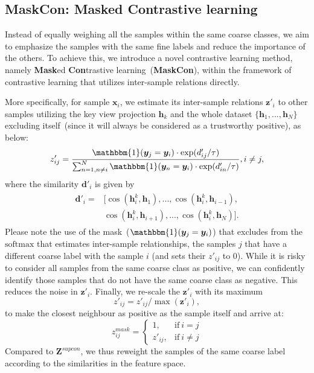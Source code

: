 \documentclass[10pt,twocolumn,letterpaper]{article}
\def\vd{{\bm{d}}}
\def\vh{{\bm{h}}}
\def\vx{{\bm{x}}}
\def\vy{{\bm{y}}}
\def\vz{{\bm{z}}}
\def\mZ{{\bm{Z}}}
\newcommand{\softmax}{\mathrm{softmax}}
\begin{document}
\subsection{MaskCon: Masked Contrastive learning}\label{method_maskcon}
Instead of equally weighing all the samples within the same coarse classes, we aim to emphasize the samples with the same fine labels and reduce the importance of the others. To achieve this, we introduce a novel contrastive learning method, namely \textbf{Mask}ed \textbf{Con}trastive learning~(\textbf{MaskCon}), within the framework of contrastive learning that utilizes inter-sample relations directly.


More specifically, for sample $\vx_i$, we estimate its inter-sample relations $\vz'_i$ to other samples utilizing the key view projection $\vh_k$ and the whole dataset $\{\vh_1, ..., \vh_N\}$ excluding itself~(since it will always be considered as a trustworthy positive), as below:
\begin{equation}\label{eq:mask_inter}
    z'_{ij} =  \frac{\mathbbm{1}(\vy_j = \vy_i)\cdot \exp(d'_{ij}/\tau)}{\sum_{n=1, n\neq i}^N\mathbbm{1}(\vy_n = \vy_i)\cdot \exp(d'_{in}/\tau)}, i\neq j,
\end{equation}
where the similarity $\vd'_i$ is given by
\begin{align}\label{eq:pseudosim}
\begin{split}
\vd'_i = &[\cos(\vh^k_i, \vh_1),...,\cos(\vh^k_i, \vh_{i-1}),\\&\cos(\vh^k_i, \vh_{i+1}),..., \cos(\vh^k_i, \vh_N)].
\end{split}
\end{align}
Please note the use of the mask~($\mathbbm{1}(\vy_j = \vy_i)$) that excludes from the $\softmax$ that estimates inter-sample relationships, the samples $j$ that have a different coarse label with the sample $i$ (and sets their $z'_{ij}$ to 0). While it is risky to consider all samples from the same coarse class as positive, we can confidently identify those samples that do not have the same coarse class as negative. This reduces the noise in $\vz'_i$.
Finally, we re-scale the $\vz'_i$ with its maximum
\begin{equation}
    z'_{ij} = z'_{ij} / \max(\vz'_i),
\end{equation}
to make the closest neighbour as positive as the sample itself and arrive at:
\begin{equation}
    z^{mask}_{ij}=\left\{
                \begin{array}{ll}
                  1, &\text{if}\ i=j\\
                  z'_{ij}, &\text{if}\ i\neq j
                \end{array}
              \right.
\end{equation}
Compared to $\mZ^{supcon}$, we thus reweight the samples of the same coarse label according to the similarities in the feature space.
\end{document}
